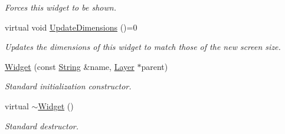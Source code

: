 \begin{DoxyCompactItemize}
\begin{DoxyCompactList}\small\item\em Forces this widget to be shown. \item\end{DoxyCompactList}\item 
virtual void \hyperlink{classMezzanine_1_1UI_1_1Widget_af23f919f2912ac10230953a848c9889c}{UpdateDimensions} ()=0
\begin{DoxyCompactList}\small\item\em Updates the dimensions of this widget to match those of the new screen size. \item\end{DoxyCompactList}\item 
\hyperlink{classMezzanine_1_1UI_1_1Widget_add763ac9363712f608218244b6fa0111}{Widget} (const \hyperlink{namespaceMezzanine_acf9fcc130e6ebf08e3d8491aebcf1c86}{String} \&name, \hyperlink{classMezzanine_1_1UI_1_1Layer}{Layer} $\ast$parent)
\begin{DoxyCompactList}\small\item\em Standard initialization constructor. \item\end{DoxyCompactList}\item 
\hypertarget{classMezzanine_1_1UI_1_1Widget_ae5ef8e2cfe6330d11581f3f1b2a640a3}{
virtual \hyperlink{classMezzanine_1_1UI_1_1Widget_ae5ef8e2cfe6330d11581f3f1b2a640a3}{$\sim$Widget} ()}
\label{classMezzanine_1_1UI_1_1Widget_ae5ef8e2cfe6330d11581f3f1b2a640a3}

\begin{DoxyCompactList}\small\item\em Standard destructor. \item\end{DoxyCompactList}\end{DoxyCompactItemize}
